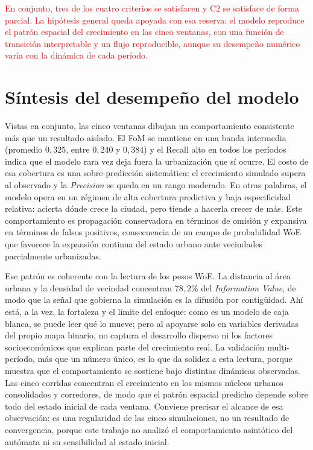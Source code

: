 \textcolor{red}{En conjunto, tres de los cuatro criterios se satisfacen y C2 se satisface de forma parcial. La hipótesis general queda apoyada con esa reserva: el modelo reproduce el patrón espacial del crecimiento en las cinco ventanas, con una función de transición interpretable y un flujo reproducible, aunque su desempeño numérico varía con la dinámica de cada período.}


\section{Síntesis del desempeño del modelo}
\label{sec:sintesis-desempeno}

Vistas en conjunto, las cinco ventanas dibujan un comportamiento consistente más que un resultado aislado. El FoM se mantiene en una banda intermedia (promedio $0{,}325$, entre $0{,}240$ y $0{,}384$) y el Recall alto en todos los períodos indica que el modelo rara vez deja fuera la urbanización que sí ocurre. El costo de esa cobertura es una sobre-predicción sistemática: el crecimiento simulado supera al observado y la \textit{Precision} se queda en un rango moderado. En otras palabras, el modelo opera en un régimen de alta cobertura predictiva y baja especificidad relativa: acierta dónde crece la ciudad, pero tiende a hacerla crecer de más. Este comportamiento es propagación conservadora en términos de omisión y expansiva en términos de falsos positivos, consecuencia de un campo de probabilidad WoE que favorece la expansión continua del estado urbano ante vecindades parcialmente urbanizadas.

Ese patrón es coherente con la lectura de los pesos WoE. La distancia al área urbana y la densidad de vecindad concentran $78{,}2$\% del \textit{Information Value}, de modo que la señal que gobierna la simulación es la difusión por contigüidad. Ahí está, a la vez, la fortaleza y el límite del enfoque: como es un modelo de caja blanca, se puede leer qué lo mueve; pero al apoyarse solo en variables derivadas del propio mapa binario, no captura el desarrollo disperso ni los factores socioeconómicos que explican parte del crecimiento real. La validación multi-período, más que un número único, es lo que da solidez a esta lectura, porque muestra que el comportamiento se sostiene bajo distintas dinámicas observadas. Las cinco corridas concentran el crecimiento en los mismos núcleos urbanos consolidados y corredores, de modo que el patrón espacial predicho depende sobre todo del estado inicial de cada ventana. Conviene precisar el alcance de esa observación: es una regularidad de las cinco simulaciones, no un resultado de convergencia, porque este trabajo no analizó el comportamiento asintótico del autómata ni su sensibilidad al estado inicial.

